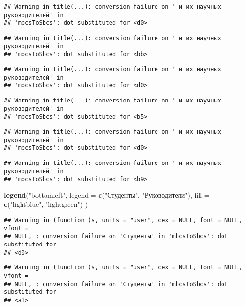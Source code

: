 \documentclass[
]{article}
\newenvironment{Shaded}{\begin{snugshade}}{\end{snugshade}}
\newcommand{\AttributeTok}[1]{\textcolor[rgb]{0.13,0.29,0.53}{#1}}
\newcommand{\FunctionTok}[1]{\textcolor[rgb]{0.13,0.29,0.53}{\textbf{#1}}}
\newcommand{\NormalTok}[1]{#1}
\newcommand{\StringTok}[1]{\textcolor[rgb]{0.31,0.60,0.02}{#1}}
\begin{document}
\begin{verbatim}
## Warning in title(...): conversion failure on ' и их научных руководителей' in
## 'mbcsToSbcs': dot substituted for <d0>
\end{verbatim}

\begin{verbatim}
## Warning in title(...): conversion failure on ' и их научных руководителей' in
## 'mbcsToSbcs': dot substituted for <bb>
\end{verbatim}

\begin{verbatim}
## Warning in title(...): conversion failure on ' и их научных руководителей' in
## 'mbcsToSbcs': dot substituted for <d0>
\end{verbatim}

\begin{verbatim}
## Warning in title(...): conversion failure on ' и их научных руководителей' in
## 'mbcsToSbcs': dot substituted for <b5>
\end{verbatim}

\begin{verbatim}
## Warning in title(...): conversion failure on ' и их научных руководителей' in
## 'mbcsToSbcs': dot substituted for <d0>
\end{verbatim}

\begin{verbatim}
## Warning in title(...): conversion failure on ' и их научных руководителей' in
## 'mbcsToSbcs': dot substituted for <b9>
\end{verbatim}

\begin{Shaded}
\begin{Highlighting}[]
\FunctionTok{legend}\NormalTok{(}\StringTok{"bottomleft"}\NormalTok{,}
       \AttributeTok{legend =} \FunctionTok{c}\NormalTok{(}\StringTok{"Студенты"}\NormalTok{, }\StringTok{"Руководители"}\NormalTok{),}
       \AttributeTok{fill =} \FunctionTok{c}\NormalTok{(}\StringTok{"lightblue"}\NormalTok{, }\StringTok{"lightgreen"}\NormalTok{)}
\NormalTok{)}
\end{Highlighting}
\end{Shaded}

\begin{verbatim}
## Warning in (function (s, units = "user", cex = NULL, font = NULL, vfont =
## NULL, : conversion failure on 'Студенты' in 'mbcsToSbcs': dot substituted for
## <d0>
\end{verbatim}

\begin{verbatim}
## Warning in (function (s, units = "user", cex = NULL, font = NULL, vfont =
## NULL, : conversion failure on 'Студенты' in 'mbcsToSbcs': dot substituted for
## <a1>
\end{verbatim}
\end{document}
